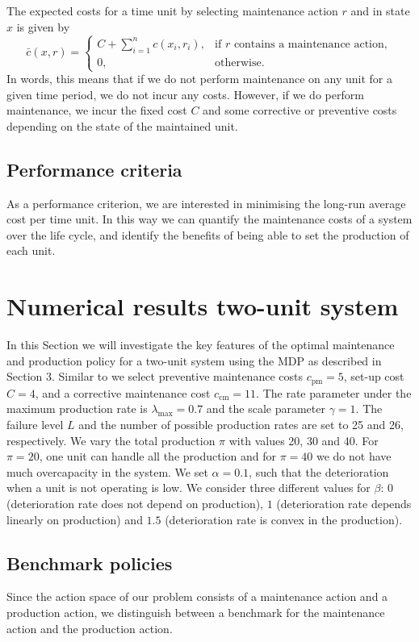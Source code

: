 \documentclass[a4paper,12pt]{article}
\begin{document}
The expected costs for a time unit by selecting maintenance action $r$ and in state $x$ is given by
$$
\bar{c}(x,r) = \begin{cases}
C + \sum_{i=1}^{n}c(x_i, r_i), &\text{if } r \text{ contains a maintenance action},\\
0, &\text{otherwise}.
\end{cases}
$$
In words, this means that if we do not perform maintenance on any unit for a given time period, we do not incur any costs. However, if we do perform maintenance, we incur the fixed cost $C$ and some corrective or preventive costs depending on the state of the maintained unit.
\subsection{Performance criteria}
As a performance criterion, we are interested in minimising the long-run average cost per time unit. In this way we can quantify the maintenance costs of a system over the life cycle, and identify the benefits of being able to set the production of each unit. 

\section{Numerical results two-unit system}
In this Section we will investigate the key features of the optimal maintenance and production policy for a two-unit system using the MDP as described in Section 3. Similar to \cite{OLDEKEIZER2018319} we select preventive maintenance costs $c_\text{pm} = 5$, set-up cost $C = 4$, and a corrective maintenance cost $c_\text{cm} = 11$. The rate parameter under the maximum production rate is $\lambda_{\text{max}} = 0.7$ and the scale parameter $\gamma = 1$. The failure level $L$ and the number of possible production rates are set to 25 and 26, respectively. We vary the total production $\pi$ with values 20, 30 and 40. For $\pi = 20$, one unit can handle all the production and for $\pi = 40$ we do not have much overcapacity in the system. We set $\alpha = 0.1$, such that the deterioration when a unit is not operating is low. We consider three different values for $\beta$:  $0$ (deterioration rate does not depend on production), $1$ (deterioration rate depends linearly on production) and $1.5$ (deterioration rate is convex in the production).



\subsection{Benchmark policies}
Since the action space of our problem consists of a maintenance action and a production action, we distinguish between a benchmark for the maintenance action and the production action. 
\end{document}
